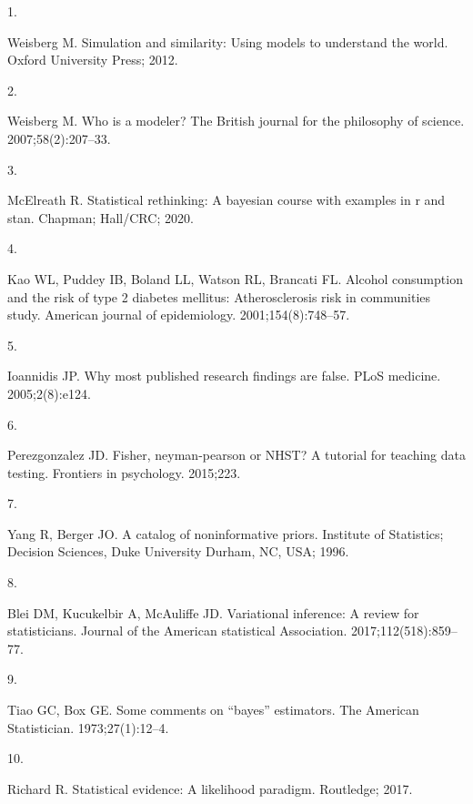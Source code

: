 \documentclass[
  10pt,
]{scrbook}
\newlength{\cslhangindent}
\newlength{\csllabelwidth}
\newlength{\cslentryspacingunit} %
\newenvironment{CSLReferences}[2] %
 {%
  \setlength{\parindent}{0pt}
  \ifodd #1
  \let\oldpar\par
  \def\par{\hangindent=\cslhangindent\oldpar}
  \fi
  \setlength{\parskip}{#2\cslentryspacingunit}
 }%
 {}
\newcommand{\CSLLeftMargin}[1]{\parbox[t]{\csllabelwidth}{#1}}
\newcommand{\CSLRightInline}[1]{\parbox[t]{\linewidth - \csllabelwidth}{#1}\break}
\begin{document}
\hypertarget{refs}{}
\begin{CSLReferences}{0}{0}
\leavevmode{}%
\CSLLeftMargin{1. }
\CSLRightInline{Weisberg M. Simulation and similarity: Using models to understand the world. Oxford University Press; 2012. }

\leavevmode{}%
\CSLLeftMargin{2. }
\CSLRightInline{Weisberg M. Who is a modeler? The British journal for the philosophy of science. 2007;58(2):207--33. }

\leavevmode{}%
\CSLLeftMargin{3. }
\CSLRightInline{McElreath R. Statistical rethinking: A bayesian course with examples in r and stan. Chapman; Hall/CRC; 2020. }

\leavevmode{}%
\CSLLeftMargin{4. }
\CSLRightInline{Kao WL, Puddey IB, Boland LL, Watson RL, Brancati FL. Alcohol consumption and the risk of type 2 diabetes mellitus: Atherosclerosis risk in communities study. American journal of epidemiology. 2001;154(8):748--57. }

\leavevmode{}%
\CSLLeftMargin{5. }
\CSLRightInline{Ioannidis JP. Why most published research findings are false. PLoS medicine. 2005;2(8):e124. }

\leavevmode{}%
\CSLLeftMargin{6. }
\CSLRightInline{Perezgonzalez JD. Fisher, neyman-pearson or NHST? A tutorial for teaching data testing. Frontiers in psychology. 2015;223. }

\leavevmode{}%
\CSLLeftMargin{7. }
\CSLRightInline{Yang R, Berger JO. A catalog of noninformative priors. Institute of Statistics; Decision Sciences, Duke University Durham, NC, USA; 1996. }

\leavevmode{}%
\CSLLeftMargin{8. }
\CSLRightInline{Blei DM, Kucukelbir A, McAuliffe JD. Variational inference: A review for statisticians. Journal of the American statistical Association. 2017;112(518):859--77. }

\leavevmode{}%
\CSLLeftMargin{9. }
\CSLRightInline{Tiao GC, Box GE. Some comments on {``bayes''} estimators. The American Statistician. 1973;27(1):12--4. }

\leavevmode{}%
\CSLLeftMargin{10. }
\CSLRightInline{Richard R. Statistical evidence: A likelihood paradigm. Routledge; 2017. }


\end{CSLReferences}
\end{document}
